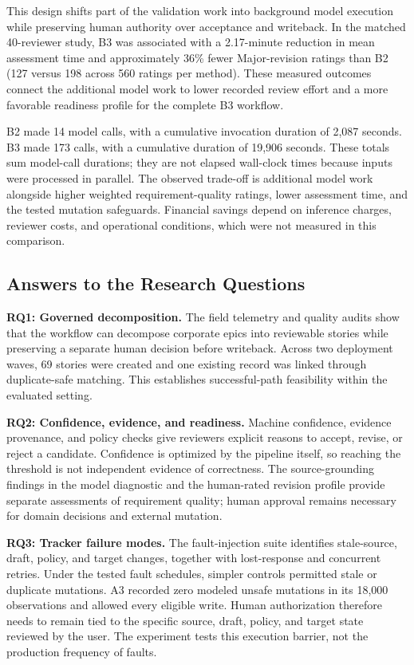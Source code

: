 \documentclass[pdflatex,sn-basic]{sn-jnl}
\begin{document}
This design shifts part of the validation work into background model execution while preserving human authority over acceptance and writeback. In the matched 40-reviewer study, B3 was associated with a 2.17-minute reduction in mean assessment time and approximately 36\% fewer Major-revision ratings than B2 (127 versus 198 across 560 ratings per method). These measured outcomes connect the additional model work to lower recorded review effort and a more favorable readiness profile for the complete B3 workflow.

B2 made 14 model calls, with a cumulative invocation duration of 2,087 seconds. B3 made 173 calls, with a cumulative duration of 19,906 seconds. These totals sum model-call durations; they are not elapsed wall-clock times because inputs were processed in parallel. The observed trade-off is additional model work alongside higher weighted requirement-quality ratings, lower assessment time, and the tested mutation safeguards. Financial savings depend on inference charges, reviewer costs, and operational conditions, which were not measured in this comparison.

\subsection{Answers to the Research Questions}
\textbf{RQ1: Governed decomposition.} The field telemetry and quality audits show that the workflow can decompose corporate epics into reviewable stories while preserving a separate human decision before writeback. Across two deployment waves, 69 stories were created and one existing record was linked through duplicate-safe matching. This establishes successful-path feasibility within the evaluated setting.

\textbf{RQ2: Confidence, evidence, and readiness.} Machine confidence, evidence provenance, and policy checks give reviewers explicit reasons to accept, revise, or reject a candidate. Confidence is optimized by the pipeline itself, so reaching the threshold is not independent evidence of correctness. The source-grounding findings in the model diagnostic and the human-rated revision profile provide separate assessments of requirement quality; human approval remains necessary for domain decisions and external mutation.

\textbf{RQ3: Tracker failure modes.} The fault-injection suite identifies stale-source, draft, policy, and target changes, together with lost-response and concurrent retries. Under the tested fault schedules, simpler controls permitted stale or duplicate mutations. A3 recorded zero modeled unsafe mutations in its 18,000 observations and allowed every eligible write. Human authorization therefore needs to remain tied to the specific source, draft, policy, and target state reviewed by the user. The experiment tests this execution barrier, not the production frequency of faults.
\end{document}
